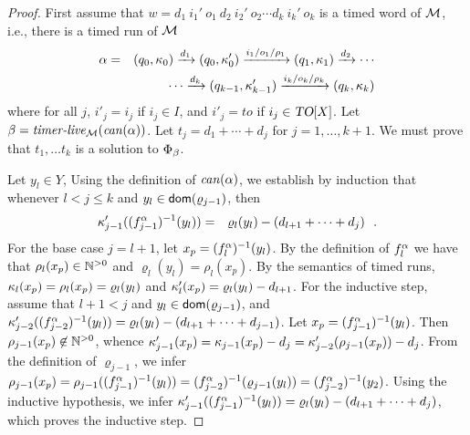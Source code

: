 \begin{proof}
First assume that
$w =  d_1 ~ i_1' ~ o_1 ~ d_2 ~ i_2' ~ o_2 \cdots d_k ~ i_k' ~ o_k$
is a timed word of ${\mathcal M}$, i.e., there is a timed run of ${\mathcal M}$
\begin{eqnarray*}
\alpha & = & (q_0,\kappa_0) \xrightarrow{d_1} (q_0,\kappa_0') \xrightarrow{i_1/o_1/\rho_1} (q_1,\kappa_1) \xrightarrow{d_2} 
\cdots
\\ && \qquad \cdots
\xrightarrow{d_k} (q_{k-1},\kappa_{k-1}') \xrightarrow{i_k/o_k/\rho_k} (q_k,\kappa_k)
\end{eqnarray*}
where for all  $j$,
$i'_j   =   i_j$ if $i_j \in I$, and
$i'_j   = \mathit{to}$ if $i_j \in \mbox{\sl TO}[X]$.
Let $\beta = \mbox{\it timer-live}_{{\mathcal M}}({\mathit{can}({\alpha})})$.
Let $t_j = d_1 + \cdots + d_j$ for $j = 1 , \ldots, k+1$.
We must prove that $t_1, \ldots t_k$ is a solution to $\Phi_{\beta}$.

Let $y_l \in Y$,
Using the definition of $\mathit{can}({\alpha})$, we establish by induction that 
 whenever $l < j \leq k$ and
 $y_l \in {\textsf{dom}}(\varrho_{j-1})$, then
\begin{eqnarray*}
 \kappa_{j-1}'((f_{j-1}^{\alpha})^{-1}(y_l)) & = &
 \varrho_l(y_l) - (d_{l+1} + \cdots + d_j)
 \ \ .
\end{eqnarray*}
 For the base case $j = l+1$, let $x_p = (f_{l}^{\alpha})^{-1}(y_l)$.
 By the definition of $f_{l}^{\alpha}$ we have that
 $\rho_l(x_p)  \in {\mathbb N}^{>0}$ and  
 $\varrho_l(y_l) = \rho_l(x_p)$. By the semantics of timed runs,
 $\kappa_l(x_p) =  \rho_l(x_p) = \varrho_l(y_l)$ and
 $\kappa_l'(x_p) =  \varrho_l(y_l) - d_{l+1}$.
 For the inductive step, assume that $l+1 < j$ and 
 $y_l \in {\textsf{dom}}(\varrho_{j-1})$, and
 $\kappa_{j-2}'((f_{j-2}^{\alpha})^{-1}(y_l)) =
 \varrho_l(y_l) - (d_{l+1} + \cdots + d_{j-1})$.
 Let $x_p = (f_{j-1}^{\alpha})^{-1}(y_l)$.
 Then $\rho_{j-1}(x_p) \not\in {\mathbb N}^{>0}$, whence
 $\kappa_{j-1}'(x_p) =  \kappa_{j-1}(x_p) -d_j = 
 \kappa_{j-2}'(\rho_{j-1}(x_p)) - d_j$.
 From the definition of $\varrho_{j-1}$, we infer
 $\rho_{j-1}(x_p) = \rho_{j-1}((f_{j-1}^{\alpha})^{-1}(y_l)) =
 (f_{j-2}^{\alpha})^{-1}(\varrho_{j-1}(y_l)) =
 (f_{j-2}^{\alpha})^{-1}(y_2)$. Using the inductive hypothesis, we infer
 $\kappa_{j-1}'((f_{j-1}^{\alpha})^{-1}(y_l)) =
 \varrho_l(y_l) - (d_{l+1} + \cdots + d_j)$, which proves the inductive
 step.


\end{proof}
